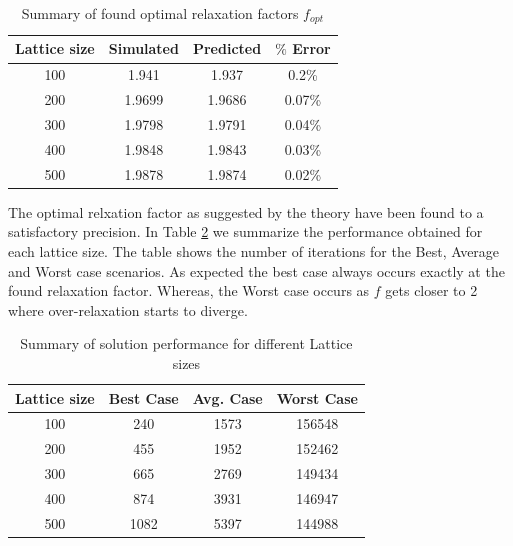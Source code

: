 \documentclass{article}
\begin{document}
\begin{table}[H]
  \begin{center}
    \begin{tabular}{|c|c|c|c|}
      \hline
      Lattice size & Simulated & Predicted & $\%$ Error \\
      \hline
      100 &  1.941 & 1.937 & 0.2\%\\
      \hline
      200 & 1.9699 & 1.9686 & 0.07\% \\
      \hline
      300 &  1.9798 & 1.9791 &  0.04\% \\
      \hline
      400 & 1.9848 & 1.9843 &  0.03\% \\
      \hline
      500 & 1.9878 & 1.9874 &  0.02\% \\
      \hline
    \end{tabular}
  \end{center}
  \caption {Summary of found optimal relaxation factors $f_{opt}$}
  \label{tab:op_relax_factor}
\end{table}

The optimal relxation factor as suggested by the theory have been found to a satisfactory precision. In Table \ref{tab:relax_iter}
we summarize the performance obtained for each lattice size. The table shows the number of iterations for the Best, Average
and Worst case scenarios. As expected the best case always occurs exactly at the found relaxation factor. Whereas, the Worst case
occurs as $f$ gets closer to 2 where over-relaxation starts to diverge.

\begin{table}[H]
  \begin{center}
    \begin{tabular}{|c|c|c|c|}
      \hline
      Lattice size & Best Case & Avg. Case & Worst Case \\
      \hline
      100 & 240 & 1573 & 156548 \\
      \hline
      200 & 455 & 1952 & 152462 \\
      \hline
      300 & 665 & 2769 & 149434 \\
      \hline
      400 & 874 & 3931 & 146947 \\
      \hline
      500 & 1082 & 5397 & 144988 \\
      \hline
    \end{tabular}
  \end{center}
  \caption {Summary of solution performance for different Lattice sizes}
  \label{tab:relax_iter}
\end{table}
\end{document}
